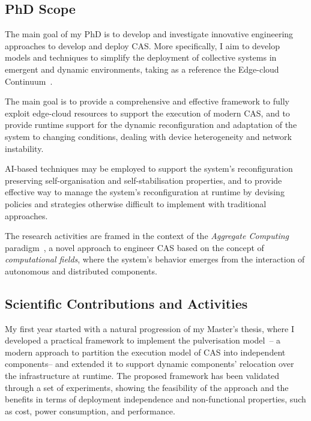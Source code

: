 \documentclass[runningheads]{llncs}
\begin{document}
\subsection{PhD Scope}

The main goal of my PhD is to develop and investigate innovative engineering approaches to develop and deploy CAS.
%
More specifically,
I aim to develop models and techniques to simplify the deployment of collective systems in emergent and dynamic environments,
taking as a reference the Edge-cloud Continuum~\cite{DBLP:journals/access/MoreschiniPLNHT22}.

The main goal is to provide a comprehensive and effective framework to fully exploit edge-cloud resources to support the execution of modern CAS,
and to provide runtime support for the dynamic reconfiguration and adaptation of the system to changing conditions,
dealing with device heterogeneity and network instability.

AI-based techniques may be employed to support the system's reconfiguration preserving self-organisation and self-stabilisation properties,
and to provide effective way to manage the system's reconfiguration at runtime by devising policies and strategies otherwise difficult to implement with traditional approaches.


The research activities are framed in the context of the \emph{Aggregate Computing} paradigm~\cite{DBLP:journals/computer/BealPV15},
a novel approach to engineer CAS based on the concept of \emph{computational fields},
where the system's behavior emerges from the interaction of autonomous and distributed components.

\subsection{Scientific Contributions and Activities}

My first year started with a natural progression of my Master's thesis,
where I developed a practical framework to implement the pulverisation model~\cite{DBLP:journals/fi/CasadeiPPVW20,DBLP:journals/iotj/CasadeiFPPSV22}--
a modern approach to partition the execution model of CAS into independent components--
and extended it to support dynamic components' relocation over the infrastructure at runtime.
%
The proposed framework has been validated through a set of experiments,
showing the feasibility of the approach and the benefits in terms of deployment independence and non-functional properties,
such as cost,
power consumption,
and performance.
\end{document}
